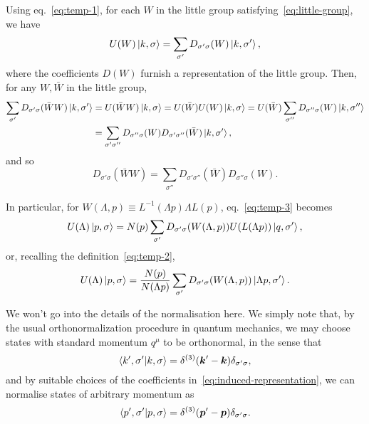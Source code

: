Using eq.~\eqref{eq:temp-1}, for each $W$ in the little group satisfying~\eqref{eq:little-group}, we have
\begin{equation}
    U(W) \ket{k,\sigma} = \sum_{\sigma'} D_{\sigma'\sigma}(W) \ket{k,\sigma'} ,
\end{equation}
where the coefficients $D(W)$ furnish a representation of the little group. Then, for any $W,\bar{W}$ in the little group,
\begin{equation*}
\begin{split}
    \sum_{\sigma'} D_{\sigma'\sigma} (\bar{W}W) \ket{k,\sigma'} &= U(\bar{W}W)  \ket{k,\sigma} = U(\bar{W}) U(W) \ket{k,\sigma} = U(\bar{W}) \sum_{\sigma''} D_{\sigma''\sigma}(W) \ket{k,\sigma''} \\ &= \sum_{\sigma' \sigma''} D_{\sigma''\sigma}(W) D_{\sigma'\sigma''}(\bar{W}) \ket{k,\sigma'} ,
\end{split}
\end{equation*}
and so
\begin{equation}
    D_{\sigma'\sigma}(\bar{W}W) = \sum_{\sigma''} D_{\sigma'\sigma''} (\bar{W}) D_{\sigma'' \sigma}(W) .
\end{equation}

In particular, for $W(\Lambda,p) \equiv L^{-1}(\Lambda p) \Lambda L(p)$, eq.~\eqref{eq:temp-3} becomes
\begin{equation}
   U(\Lambda) \ket{p,\sigma} = N(p) \sum_{\sigma'} D_{\sigma'\sigma}(W(\Lambda,p))U(L(\Lambda p)) \ket{q,\sigma'} ,
\end{equation}
or, recalling the definition~\eqref{eq:temp-2},
\begin{equation}\label{eq:induced-representation}
    U(\Lambda) \ket{p,\sigma} = \frac{N(p)}{N(\Lambda p)} \sum_{\sigma'} D_{\sigma'\sigma} (W(\Lambda, p)) \ket{\Lambda p, \sigma'} .
\end{equation}

We won't go into the details of the normalisation here. We simply note that, by the usual orthonormalization procedure in quantum mechanics, we may choose states with standard momentum $q^\mu$ to be orthonormal, in the sense that
\begin{equation}
    \braket{k',\sigma'}{k,\sigma} = \delta^{(3)}(\boldsymbol{k}' - \boldsymbol{k}) \delta_{\sigma'\sigma} ,
\end{equation}
and by suitable choices of the coefficients in~\eqref{eq:induced-representation}, we can normalise states of arbitrary momentum as
\begin{equation}
    \braket{p',\sigma'}{p,\sigma} = \delta^{(3)}(\boldsymbol{p}' - \boldsymbol{p}) \delta_{\sigma'\sigma} .
\end{equation}

